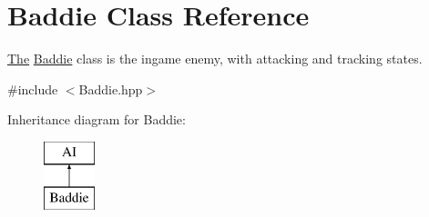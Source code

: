 \hypertarget{class_baddie}{}\section{Baddie Class Reference}
\label{class_baddie}


\hyperlink{namespace_the}{The} \hyperlink{class_baddie}{Baddie} class is the ingame enemy, with attacking and tracking states.  




{\ttfamily \#include $<$Baddie.\+hpp$>$}

Inheritance diagram for Baddie\+:\begin{figure}[H]
\begin{center}
\leavevmode
\includegraphics[height=2.000000cm]{class_baddie}
\end{center}
\end{figure}
